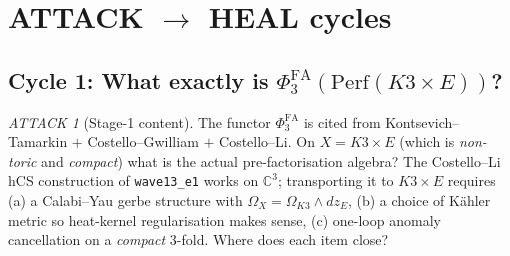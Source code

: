 \documentclass[11pt]{amsart}
\providecommand{\C}{\mathbb{C}}
\providecommand{\Perf}{\mathrm{Perf}}
\theoremstyle{plain}
\theoremstyle{definition}
\theoremstyle{remark}
\newtheorem*{attack}{ATTACK}
\begin{document}
\section{ATTACK $\to$ HEAL cycles}

\subsection{Cycle 1: What exactly is $\Phi^{\mathrm{FA}}_3(\Perf(K3\times E))$?}

\begin{attack}[Stage-1 content]
The functor $\Phi^{\mathrm{FA}}_3$ is cited from Kontsevich--Tamarkin
$+$ Costello--Gwilliam $+$ Costello--Li. On $X=K3\times E$ (which is
\emph{non-toric} and \emph{compact}) what is the actual pre-factorisation
algebra? The Costello--Li hCS construction of
\texttt{wave13\_e1} works on $\C^3$; transporting it to $K3\times E$
requires (a) a Calabi--Yau gerbe structure with $\Omega_X=\Omega_{K3}\wedge
dz_E$, (b) a choice of K\"ahler metric so heat-kernel regularisation
makes sense, (c) one-loop anomaly cancellation on a \emph{compact}
$3$-fold. Where does each item close?
\end{attack}
\end{document}
